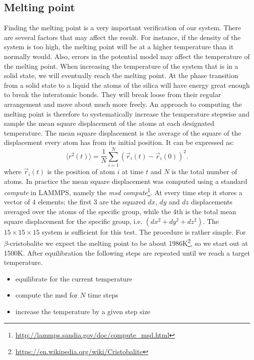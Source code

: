 \documentclass[twoside,english]{uiofysmaster}
\newcommand\lr[1]{\left(#1\right)}
\begin{document}
\subsection{Melting point}
Finding the melting point is a very important verification of our system. 
There are several factors that may affect the result. For instance, if the density of the system is too high, the melting point will be at a higher temperature than it normally would. 
Also, errors in the potential model may affect the temperature of the melting point. 
When increasing the temperature of the system that is in a solid state, we will eventually reach the melting point.
At the phase transition from a solid state to a liquid the atoms of the silica will have energy great enough to break the interatomic bonds. 
They will break loose from their regular arrangement and move about much more freely. 
An approach to computing the melting point is therefore to systematically increase the temperature stepwise and sample the mean square displacement of the atoms at each designated temperature.  
The mean square displacement is the average of the square of the displacement every atom has from its initial position. It can be expressed as:
\begin{equation}
\langle r^2(t)\rangle = \frac{1}{N}\sum_{i=1}^{N}\lr{\vec{r}_i(t)-\vec{r}_i(0)}^2. \label{eq: diffusion constant}
\end{equation}
where $\vec{r}_i(t)$ is the position of atom $i$ at time $t$ and $N$ is the total number of atoms. 
In practice the mean square displacement was computed using a standard \textit{compute} in LAMMPS, namely the \textit{msd compute}\footnote{\url{http://lammps.sandia.gov/doc/compute_msd.html}}. 
At every time step it stores a vector of 4 elements; the first 3 are the squared $dx$, $dy$ and $dz$ displacements averaged over the atoms of the specific group, while the 4th is the total mean square displacement for the specific group, i.e. $(dx^2 + dy^2 + dz^2)$. 
The $15\times15\times15$ system is sufficient for this test. The procedure is rather simple. For $\beta$-cristobalite we expect the melting point to be about 1986K\footnote{\url{https://en.wikipedia.org/wiki/Cristobalite}}, so we start out at 1500K. After equilibration the following steps are repeated until we reach a target temperature. 
\begin{itemize}
	\item equilibrate for the current temperature
	\item compute the msd for $N$ time steps
	\item increase the temperature by a given step size
\end{itemize}
\end{document}
